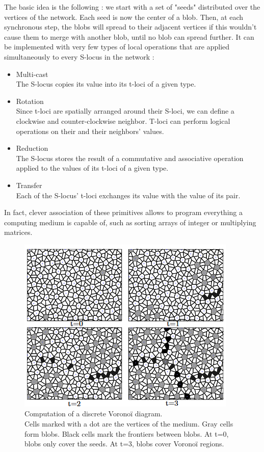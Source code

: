 \documentclass{article}
\begin{document}
The basic idea is the following : we start with a set of "seeds" distributed over the vertices of the network. Each seed is now the center of a blob. Then, at each synchronous step, the blobs will spread to their adjacent vertices if this wouldn't cause them to merge with another blob, until no blob can spread further. It can be implemented with very few types of local operations that are applied simultaneously to every S-locus in the network :
\begin{itemize}
	\item Multi-cast\\
	The S-locus copies its value into its t-loci of a given type.
	\item Rotation\\
	Since t-loci are spatially arranged around their S-loci, we can define a clockwise and counter-clockwise neighbor. T-loci can perform logical operations on their and their neighbors' values.
	\item Reduction\\
	The S-locus stores the result of a commutative and associative operation applied to the values of its t-loci of a given type.
	\item Transfer\\
	Each of the S-locus' t-loci exchanges its value with the value of its pair. 
\end{itemize}
In fact, clever association of these primitives allows to program everything a computing medium is capable of, such as sorting arrays of integer or multiplying matrices.\cite{other_computation}

\begin{figure}[H]
	\centering\includegraphics[width=0.7\linewidth]{assets/voronoi_spread.png}
	\caption{
		Computation of a discrete Voronoï diagram.\\
		Cells marked with a dot are the vertices of the medium.
		Gray cells form blobs. Black cells mark the frontiers between blobs. At t=0, blobs only cover the seeds. At t=3, blobs cover Voronoï regions.
	}
	\label{fig:voronoi_spread}
\end{figure}
\end{document}
